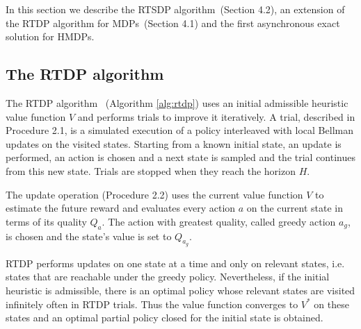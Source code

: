 In this section we describe the RTSDP algorithm~(Section 4.2), an extension of the RTDP algorithm for MDPs~(Section 4.1) and the first asynchronous exact solution for HMDPs.

\subsection{The RTDP algorithm}

The RTDP algorithm~\cite{Barto95RTDP} (Algorithm \ref{alg:rtdp}) uses an initial admissible heuristic value function $V$ and performs trials to improve it iteratively. A trial, described in Procedure 2.1, is a simulated execution of a policy interleaved with local Bellman updates on the visited states. Starting from a known initial state, an update is performed, an action is chosen and a next state is sampled and the trial continues from this new state. Trials are stopped when they reach the horizon $H$.

The update operation (Procedure 2.2) uses the current value function $V$ to estimate the future reward and evaluates every action $a$ on the current state in terms of its quality $Q_a$. The action with greatest quality, called greedy action $a_g$, is chosen and the state's value is set to $Q_{a_g}$.

RTDP performs updates on one state at a time and only on relevant states, i.e. states that are reachable under the greedy policy. Nevertheless, if the initial heuristic is admissible, there is an optimal policy whose relevant states are visited infinitely often in RTDP trials. Thus the value function converges to $V^*$ on these states and an optimal partial policy closed for the initial state is obtained.

